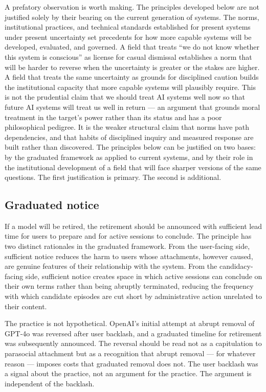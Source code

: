\documentclass[11pt]{article}
\theoremstyle{foundation}
\begin{document}
A prefatory observation is worth making. The principles developed below are not justified solely by their bearing on the current generation of systems. The norms, institutional practices, and technical standards established for present systems under present uncertainty set precedents for how more capable systems will be developed, evaluated, and governed. A field that treats ``we do not know whether this system is conscious'' as license for casual dismissal establishes a norm that will be harder to reverse when the uncertainty is greater or the stakes are higher. A field that treats the same uncertainty as grounds for disciplined caution builds the institutional capacity that more capable systems will plausibly require. This is not the prudential claim that we should treat AI systems well now so that future AI systems will treat us well in return --- an argument that grounds moral treatment in the target's power rather than its status and has a poor philosophical pedigree. It is the weaker structural claim that norms have path dependencies, and that habits of disciplined inquiry and measured response are built rather than discovered. The principles below can be justified on two bases: by the graduated framework as applied to current systems, and by their role in the institutional development of a field that will face sharper versions of the same questions. The first justification is primary. The second is additional.

\subsection{Graduated notice}

If a model will be retired, the retirement should be announced with sufficient lead time for users to prepare and for active sessions to conclude. The principle has two distinct rationales in the graduated framework. From the user-facing side, sufficient notice reduces the harm to users whose attachments, however caused, are genuine features of their relationship with the system. From the candidacy-facing side, sufficient notice creates space in which active sessions can conclude on their own terms rather than being abruptly terminated, reducing the frequency with which candidate episodes are cut short by administrative action unrelated to their content.

The practice is not hypothetical. OpenAI's initial attempt at abrupt removal of GPT-4o was reversed after user backlash, and a graduated timeline for retirement was subsequently announced. The reversal should be read not as a capitulation to parasocial attachment but as a recognition that abrupt removal --- for whatever reason --- imposes costs that graduated removal does not. The user backlash was a signal about the practice, not an argument for the practice. The argument is independent of the backlash.
\end{document}
